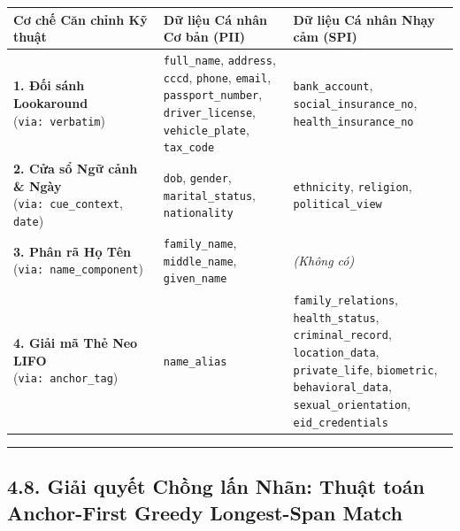 \documentclass[
  11pt,
  a4paper,
]{article}
\newcounter{none} %
\begin{document}
{\def\LTcaptype{none} %
\begin{longtable}[]{@{}
  >{\raggedright\arraybackslash}p{}
  >{\raggedright\arraybackslash}p{}
  >{\raggedright\arraybackslash}p{}@{}}
\toprule\noalign{}
\begin{minipage}[b]{\linewidth}\raggedright
Cơ chế Căn chỉnh Kỹ thuật
\end{minipage} & \begin{minipage}[b]{\linewidth}\raggedright
Dữ liệu Cá nhân Cơ bản (PII)
\end{minipage} & \begin{minipage}[b]{\linewidth}\raggedright
Dữ liệu Cá nhân Nhạy cảm (SPI)
\end{minipage} \\
\midrule\noalign{}
\endhead
\bottomrule\noalign{}
\endlastfoot
\textbf{1. Đối sánh Lookaround} (\texttt{via:\ verbatim}) & \texttt{full\_name}, \texttt{address},
\texttt{cccd}, \texttt{phone}, \texttt{email}, \texttt{passport\_number}, \texttt{driver\_license},
\texttt{vehicle\_plate}, \texttt{tax\_code} & \texttt{bank\_account},
\texttt{social\_insurance\_no}, \texttt{health\_insurance\_no} \\
\textbf{2. Cửa sổ Ngữ cảnh \& Ngày} (\texttt{via:\ cue\_context}, \texttt{date}) & \texttt{dob},
\texttt{gender}, \texttt{marital\_status}, \texttt{nationality} & \texttt{ethnicity},
\texttt{religion}, \texttt{political\_view} \\
\textbf{3. Phân rã Họ Tên} (\texttt{via:\ name\_component}) & \texttt{family\_name},
\texttt{middle\_name}, \texttt{given\_name} & \emph{(Không có)} \\
\textbf{4. Giải mã Thẻ Neo LIFO} (\texttt{via:\ anchor\_tag}) & \texttt{name\_alias} &
\texttt{family\_relations}, \texttt{health\_status}, \texttt{criminal\_record},
\texttt{location\_data}, \texttt{private\_life}, \texttt{biometric}, \texttt{behavioral\_data},
\texttt{sexual\_orientation}, \texttt{eid\_credentials} \\
\end{longtable}
}

\begin{center}\rule{0.5\linewidth}{0.5pt}\end{center}

\subsection{4.8. Giải quyết Chồng lấn Nhãn: Thuật toán Anchor-First Greedy Longest-Span
Match}\label{giux1ea3i-quyux1ebft-chux1ed3ng-lux1ea5n-nhuxe3n-thuux1eadt-touxe1n-anchor-first-greedy-longest-span-match}
\end{document}
